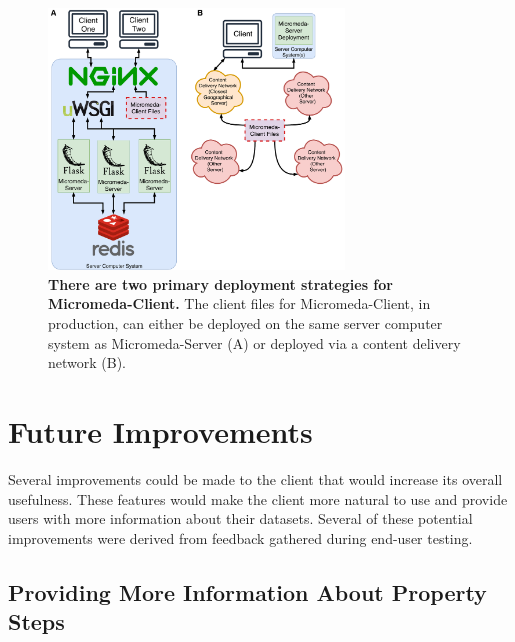 \begin{figure}[!ht]
  \centering
	\includegraphics[width=0.7\textwidth]{media/micromeda-client-deployment.pdf}
	 \caption[There are two primary deployment strategies for Micromeda-Client. ]{\textbf{There are two primary deployment strategies for Micromeda-Client.} The client files for Micromeda-Client, in production, can either be deployed on the same server computer system as Micromeda-Server (A) or deployed via a content delivery network (B).}
	 \label{fig:client-deployment}
\end{figure}

\section{Future Improvements} \label{client-improvements}

Several improvements could be made to the client that would increase its overall usefulness. These features would make the client more natural to use and provide users with more information about their datasets. Several of these potential improvements were derived from feedback gathered during end-user testing.

\subsection{Providing More Information About Property Steps}

